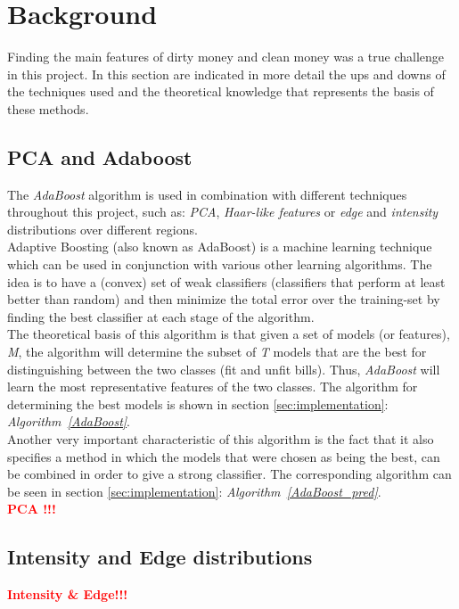 \documentclass[11pt,twocolumn]{article}
\newcommand{\todo}[1]{\textcolor{red}{\textbf{#1}}}
\begin{document}
	\section{Background}\label{sec:background}
	\hspace*{10px}Finding the main features of dirty money and clean money was a true challenge in this project. In this section are indicated in more detail the ups and downs of the techniques used and the theoretical knowledge that represents the basis of these methods.
	\subsection{PCA and Adaboost}\label{sec:PCA}
	\hspace*{10px}The \emph{AdaBoost} algorithm is used in combination with different techniques throughout this project, such as: \emph{PCA}, \emph{Haar-like features} or \emph{edge} and \emph{intensity} distributions over different regions.\\
		\hspace*{10px}Adaptive Boosting (also known as AdaBoost) is a machine learning technique which can be used in conjunction with various other learning algorithms. The idea is to have a (convex) set of weak classifiers (classifiers that perform at least better than random) and then minimize the total error over the training-set by finding the best classifier at each stage of the algorithm.\\
		\hspace*{10px}The theoretical basis of this algorithm is that given a set of models (or features), \emph{M}, the algorithm will determine the subset of \emph{T} models that are the best for distinguishing between the two classes (fit and unfit bills). Thus, \emph{AdaBoost} will learn the most representative features of the two classes. The algorithm for determining the best models is shown in section \ref{sec:implementation}: \emph{Algorithm~\ref{AdaBoost}}.\\
		\hspace*{10px}Another very important characteristic of this algorithm is the fact that it also specifies a method in which the models that were chosen as being the best, can be combined in order to give a strong classifier. The corresponding algorithm can be seen in section \ref{sec:implementation}: \emph{Algorithm~\ref{AdaBoost_pred}}.\\
		\todo{\hspace*{10px}PCA !!!} 
	\subsection{Intensity and Edge distributions}\label{sec:Intensity_Edge}
		\todo{\hspace*{10px}Intensity \& Edge!!!\\}
\end{document}
